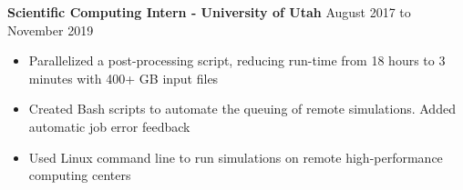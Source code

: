 \documentclass{article}
\begin{document}
\vspace{2mm}

\noindent \textbf{Scientific Computing Intern - University of Utah} \hfill  August 2017 to November 2019
\begin{itemize}
    \item Parallelized a post-processing script, reducing run-time from 18 hours to 3 minutes with 400+ GB input files
    \item Created Bash scripts to automate the queuing of remote simulations. Added automatic job error feedback
    \item Used Linux command line to run simulations on remote high-performance computing centers
\end{itemize}
\end{document}
